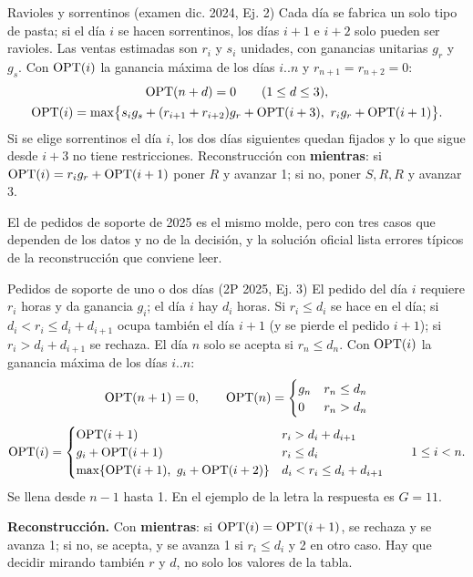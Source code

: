 \begin{problema}{Ravioles y sorrentinos (examen dic. 2024, Ej. 2)}
Cada día se fabrica un solo tipo de pasta; si el día $i$ se hacen
sorrentinos, los días $i+1$ e $i+2$ solo pueden ser ravioles. Las ventas
estimadas son $r_i$ y $s_i$ unidades, con ganancias unitarias $g_r$ y $g_s$.
Con $\mathrm{OPT}(i)$ la ganancia máxima de los días $i..n$ y $r_{n+1}=r_{n+2}=0$:
\begin{gather*}
\OPT(n+d)=0\qquad (1\le d\le3),\\
\OPT(i)=\max\bigl\{s_ig_s+(r_{i+1}+r_{i+2})g_r+\OPT(i+3),\ r_ig_r+\OPT(i+1)\bigr\}.
\end{gather*}
Si se elige sorrentinos el día $i$, los dos días siguientes quedan fijados y
lo que sigue desde $i+3$ no tiene restricciones. Reconstrucción con
\textbf{mientras}: si $\mathrm{OPT}(i)=r_ig_r+\mathrm{OPT}(i+1)$ poner $R$ y avanzar 1; si no,
poner $S,R,R$ y avanzar 3.
\end{problema}

El de pedidos de soporte de 2025 es el mismo molde, pero con tres casos que
dependen de los datos y no de la decisión, y la solución oficial lista
errores típicos de la reconstrucción que conviene leer.

\begin{problema}{Pedidos de soporte de uno o dos días (2P 2025, Ej. 3)}
El pedido del día $i$ requiere $r_i$ horas y da ganancia $g_i$; el día $i$
hay $d_i$ horas. Si $r_i\le d_i$ se hace en el día; si
$d_i<r_i\le d_i+d_{i+1}$ ocupa también el día $i+1$ (y se pierde el pedido
$i+1$); si $r_i>d_i+d_{i+1}$ se rechaza. El día $n$ solo se acepta si
$r_n\le d_n$. Con $\mathrm{OPT}(i)$ la ganancia máxima de los días $i..n$:
\[
\mathrm{OPT}(n+1)=0,\qquad \mathrm{OPT}(n)=\begin{cases}g_n & r_n\le d_n\\ 0 & r_n>d_n\end{cases}
\]
\[
\mathrm{OPT}(i)=\begin{cases}
\mathrm{OPT}(i+1) & r_i>d_i+d_{i+1}\\
g_i+\mathrm{OPT}(i+1) & r_i\le d_i\\
\max\{\mathrm{OPT}(i+1),\ g_i+\mathrm{OPT}(i+2)\} & d_i<r_i\le d_i+d_{i+1}
\end{cases}\qquad 1\le i<n.
\]
Se llena desde $n-1$ hasta 1. En el ejemplo de la letra la respuesta es
$G=11$.

\textbf{Reconstrucción.} Con \textbf{mientras}: si $\mathrm{OPT}(i)=\mathrm{OPT}(i+1)$, se
rechaza y se avanza 1; si no, se acepta, y se avanza 1 si $r_i\le d_i$ y 2 en
otro caso. Hay que decidir mirando también $r$ y $d$, no solo los valores de
la tabla.
\end{problema}

